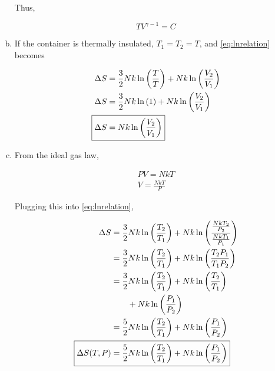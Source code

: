\documentclass[12pt,a4paper,twocolumn]{article}
\begin{document}
\begin{enumerate}[(a)]
Thus,

\begin{equation}\label{eq:answer-a}
	\boxed{
	TV^{\gamma - 1} = C
	}
\end{equation}

\item If the container is thermally insulated, $T_1 = T_2 = T$, and \eqref{eq:lnrelation} becomes

\begin{align}
	\Delta S &= \frac{3}{2} Nk \ln{\left( \frac{T}{T} \right)} + Nk \ln{\left(  \frac{V_2}{V_1} \right)} \nonumber \\
	\Delta S &= \frac{3}{2} Nk \ln{\left( 1 \right)} + Nk \ln{\left(  \frac{V_2}{V_1} \right)} \nonumber \\
	\Aboxed{
		\Delta S &= Nk \ln{\left(  \frac{V_2}{V_1} \right)}
	} \label{eq:answer-b}
\end{align}

\item From the ideal gas law,

\begin{align}
	PV = NkT \label{eq:idealgas} \\
	V = \frac{NkT}{P} \label{eq:idealvol}
\end{align}

Plugging this into \eqref{eq:lnrelation},

\begin{align}
	\Delta S &= \frac{3}{2} Nk \ln{\left( \frac{T_2}{T_1} \right)} + Nk \ln{\left(  \frac{\frac{NkT_2}{P_2}}{\frac{NkT_1}{P_1}} \right)} \nonumber \\
	&= \frac{3}{2} Nk \ln{\left( \frac{T_2}{T_1} \right)} + Nk \ln{\left(  \frac{T_2 P_1}{T_1 P_2} \right)} \nonumber \\
	&= \frac{3}{2} Nk \ln{\left( \frac{T_2}{T_1} \right)} + Nk \ln{\left(  \frac{T_2}{T_1} \right)} \nonumber \\
	&\qquad + Nk\ln{\left( \frac{P_1}{P_2} \right) } \nonumber \\
	&= \frac{5}{2} Nk \ln{\left( \frac{T_2}{T_1} \right)} + Nk \ln{\left(  \frac{P_1}{P_2} \right)} \nonumber \\
	\Aboxed{
		\Delta S(T,P) &= \frac{5}{2} Nk \ln{\left( \frac{T_2}{T_1} \right)} + Nk \ln{\left(  \frac{P_1}{P_2} \right)}
	} \label{eq:answer-c}
\end{align}

\end{enumerate}
\end{document}

